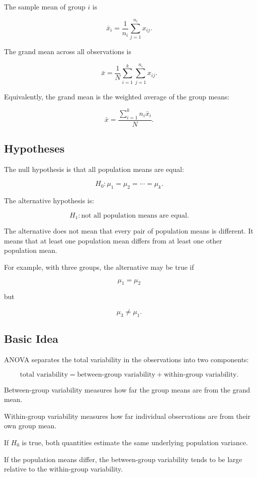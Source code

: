 \documentclass[11pt]{article}
\begin{document}
The sample mean of group \(i\) is

\[
\bar{x}_i
=
\frac{1}{n_i}
\sum_{j=1}^{n_i}x_{ij}.
\]

The grand mean across all observations is

\[
\bar{x}
=
\frac{1}{N}
\sum_{i=1}^{k}
\sum_{j=1}^{n_i}x_{ij}.
\]

Equivalently, the grand mean is the weighted average of the group means:

\[
\bar{x}
=
\frac{
\sum_{i=1}^{k}n_i\bar{x}_i
}{
N
}.
\]

\subsection{Hypotheses}

The null hypothesis is that all population means are equal:

\[
\boxed{
H_0:
\mu_1=\mu_2=\cdots=\mu_k.
}
\]

The alternative hypothesis is:

\[
\boxed{
H_1:
\text{not all population means are equal}.
}
\]

The alternative does not mean that every pair of population means is
different. It means that at least one population mean differs from at
least one other population mean.

For example, with three groups, the alternative may be true if

\[
\mu_1=\mu_2
\]

but

\[
\mu_3\neq\mu_1.
\]

\subsection{Basic Idea}

ANOVA separates the total variability in the observations into two
components:

\[
\boxed{
\text{total variability}
=
\text{between-group variability}
+
\text{within-group variability}.
}
\]

Between-group variability measures how far the group means are from the
grand mean.

Within-group variability measures how far individual observations are
from their own group mean.

If \(H_0\) is true, both quantities estimate the same underlying
population variance.

If the population means differ, the between-group variability tends to
be large relative to the within-group variability.
\end{document}

